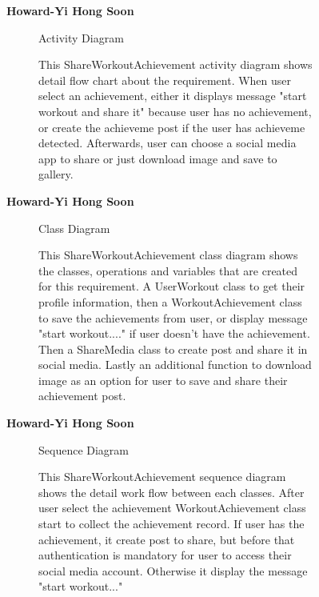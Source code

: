 \documentclass{article}
\begin{document}
	\begin{figure}[htbp]
		\textbf{Howard-Yi Hong Soon}
		\centering
		\begin{subfigure}{\textwidth}
			\resizebox{\textwidth}{!}{}
			\caption{Activity Diagram}
		\end{subfigure}
		\begin{subfigure}{\textwidth}
			This ShareWorkoutAchievement activity diagram shows detail flow chart about the requirement. 
			When user select an achievement, either it displays message "start workout and share it" because user has no 
			achievement, or create the achieveme post if the user has achieveme detected. Afterwards, user can choose a 
			social media app to share or just download image and save to gallery.
		\end{subfigure}
	\end{figure}
	
	\newpage

	\begin{figure}[htbp]
		\textbf{Howard-Yi Hong Soon}
		\centering
		\begin{subfigure}{\textwidth}
			\resizebox{\textwidth}{!}{}
			\caption{Class Diagram}
		\end{subfigure}
		\begin{subfigure}{\textwidth}
			This ShareWorkoutAchievement class diagram shows the classes, operations and variables that are created
			for this requirement. A UserWorkout class to get their profile information, then a WorkoutAchievement class to save 
			the achievements from user, or display message "start workout...." if user doesn't have the achievement. 
			Then a ShareMedia class to create post and share it in social media. Lastly an additional function to download image
			as an option for user to save and share their achievement post.
		\end{subfigure}
	\end{figure}
	
\newpage
	
	\begin{figure}[htbp]
		\textbf{Howard-Yi Hong Soon}
		\centering
		\begin{subfigure}{\textwidth}
			\resizebox{\textwidth}{!}{}
			\caption{Sequence Diagram}
		\end{subfigure}
		\begin{subfigure}{\textwidth}
			This ShareWorkoutAchievement sequence diagram shows the detail work flow between each classes. After user select the achievement
			WorkoutAchievement class start to collect the achievement record. If user has the achievement, it create post to share, but before that authentication is 
			mandatory for user to access their social media account. Otherwise it display the message "start workout..."
		\end{subfigure}
	\end{figure}
	\newpage
\end{document}
